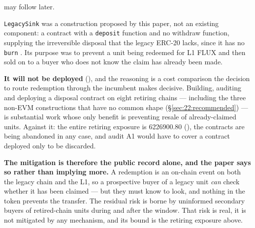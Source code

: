 may follow later.
\begin{remark}
\label{rem:no-legacysink}
\texttt{LegacySink} was a construction proposed by this paper, not an existing component: a contract
with a \texttt{deposit} function and no withdraw function, supplying the irreversible disposal that
the legacy ERC-20 lacks, since it has no \texttt{burn}
. Its purpose was to prevent a unit being redeemed for L1 FLUX
and then sold on to a buyer who does not know the claim has already been made.

\textbf{It will not be deployed}  (\planned), and the
reasoning is a cost comparison the decision to route redemption through the incumbent makes decisive.
Building, auditing and deploying a disposal contract on eight retiring chains --- including the three
non-EVM constructions that have no common shape (\S\ref{sec:22:recommended}) --- is substantial work
whose only benefit is preventing resale of already-claimed units. Against it: the entire retiring
exposure is \num{6226900.80}\flux{} (), the contracts are being
abandoned in any case, and audit A1 would have to cover a contract deployed only to be discarded.

\textbf{The mitigation is therefore the public record alone, and the paper says so rather than
implying more.} A redemption is an on-chain event on both the legacy chain and the L1, so a
prospective buyer of a legacy unit \emph{can} check whether it has been claimed --- but they must
know to look, and nothing in the token prevents the transfer. The residual risk is borne by
uninformed secondary buyers of retired-chain units during and after the window. That risk is real,
it is not mitigated by any mechanism, and its bound is the retiring exposure above.
\end{remark}


